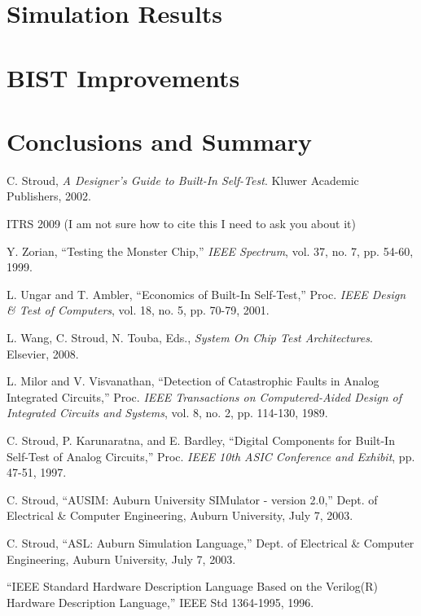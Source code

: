 \documentclass[12pt]{report}
\begin{document}
\chapter{Simulation Results}

\chapter{BIST Improvements}

\chapter{Conclusions and Summary}

\begin{thebibliography}{99}
 C. Stroud, \textit{A Designer's Guide to Built-In Self-Test}. Kluwer Academic Publishers, 2002.

 ITRS 2009 (I am not sure how to cite this I need to ask you about it)

 Y. Zorian, ``Testing the Monster Chip,'' \textit{IEEE Spectrum}, vol. 37, no. 7, pp. 54-60, 1999.

 L. Ungar and T. Ambler, ``Economics of Built-In Self-Test,'' Proc. \textit{IEEE Design \& Test of Computers}, vol. 18, no. 5, pp. 70-79, 2001. 

 L. Wang, C. Stroud, N. Touba, Eds., \textit{System On Chip Test Architectures}. Elsevier, 2008.

 L. Milor and V. Visvanathan, ``Detection of Catastrophic Faults in Analog Integrated Circuits,'' Proc. \textit{IEEE Transactions on Computered-Aided Design of Integrated Circuits and Systems}, vol. 8, no. 2, pp. 114-130, 1989.

 C. Stroud, P. Karunaratna, and E. Bardley, ``Digital Components for Built-In Self-Test of Analog Circuits,'' Proc. \textit{IEEE 10th ASIC Conference and Exhibit}, pp. 47-51, 1997.

 C. Stroud, ``AUSIM: Auburn University SIMulator - version 2.0,'' Dept. of Electrical \& 
Computer Engineering, Auburn University, July 7, 2003.

 C. Stroud, ``ASL: Auburn Simulation Language,'' Dept. of Electrical \& Computer
Engineering, Auburn University, July 7, 2003.

 ``IEEE Standard Hardware Description Language Based on the Verilog(R) Hardware Description Language,'' IEEE Std 1364-1995, 1996.


\end{thebibliography}
\end{document}
